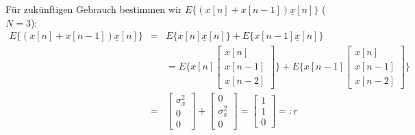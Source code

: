 Für zukünftigen Gebrauch bestimmen wir $E\{(x[n] + x[n-1]) \underline{x}[n]\}$ ($N=3$):
\begin{eqnarray}
 E\{(x[n] + x[n-1]) \underline{x}[n]\} & = & E\{x[n] \underline{x}[n]\} + E\{x[n-1] \underline{x}[n]\} \\
 & & = E\{x[n] \begin{bmatrix} x[n] \\ x[n-1] \\ x[n-2] \end{bmatrix}\} + E\{x[n-1] \begin{bmatrix} x[n] \\ x[n-1] \\ x[n-2] \end{bmatrix}\} \\
 & = & \begin{bmatrix} \sigma_x^2 \\ 0 \\ 0 \end{bmatrix} + \begin{bmatrix} 0 \\ \sigma_x^2 \\ 0 \end{bmatrix} = \begin{bmatrix} 1 \\ 1 \\ 0 \end{bmatrix} =: \underline{r}
\end{eqnarray}


